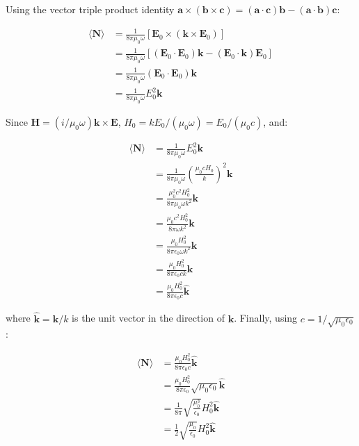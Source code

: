 \documentclass{article}
\begin{document}
Using the vector triple product identity $\mathbf{a} \times (\mathbf{b} \times \mathbf{c}) = (\mathbf{a} \cdot \mathbf{c}) \mathbf{b} - (\mathbf{a} \cdot \mathbf{b}) \mathbf{c}$:

\begin{align*}
\langle \mathbf{N} \rangle &= \frac{1}{8 \pi \mu_0 \omega} [\mathbf{E}_0 \times (\mathbf{k} \times \mathbf{E}_0)] \\
&= \frac{1}{8 \pi \mu_0 \omega} [(\mathbf{E}_0 \cdot \mathbf{E}_0) \mathbf{k} - (\mathbf{E}_0 \cdot \mathbf{k}) \mathbf{E}_0] \\
&= \frac{1}{8 \pi \mu_0 \omega} (\mathbf{E}_0 \cdot \mathbf{E}_0) \mathbf{k} \\
&= \frac{1}{8 \pi \mu_0 \omega} E_0^2 \mathbf{k}
\end{align*}

Since $\mathbf{H} = (i/\mu_0 \omega) \mathbf{k} \times \mathbf{E}$, $H_0 = k E_0 / (\mu_0 \omega) = E_0 / (\mu_0 c)$, and:

\begin{align*}
\langle \mathbf{N} \rangle &= \frac{1}{8 \pi \mu_0 \omega} E_0^2 \mathbf{k} \\
&= \frac{1}{8 \pi \mu_0 \omega} \left( \frac{\mu_0 c H_0}{k} \right)^2 \mathbf{k} \\
&= \frac{\mu_0^2 c^2 H_0^2}{8 \pi \mu_0 \omega k^2} \mathbf{k} \\
&= \frac{\mu_0 c^2 H_0^2}{8 \pi \omega k^2} \mathbf{k} \\
&= \frac{\mu_0 H_0^2}{8 \pi \epsilon_0 \omega k^2} \mathbf{k} \\
&= \frac{\mu_0 H_0^2}{8 \pi \epsilon_0 c k} \mathbf{k} \\
&= \frac{\mu_0 H_0^2}{8 \pi \epsilon_0 c} \hat{\mathbf{k}}
\end{align*}

where $\hat{\mathbf{k}} = \mathbf{k}/k$ is the unit vector in the direction of $\mathbf{k}$.  Finally, using $c = 1/\sqrt{\mu_0 \epsilon_0}$:

\begin{align*}
\langle \mathbf{N} \rangle &= \frac{\mu_0 H_0^2}{8 \pi \epsilon_0 c} \hat{\mathbf{k}} \\
&= \frac{\mu_0 H_0^2}{8 \pi \epsilon_0} \sqrt{\mu_0 \epsilon_0} \hat{\mathbf{k}} \\
&= \frac{1}{8 \pi} \sqrt{\frac{\mu_0^3}{\epsilon_0}} H_0^2 \hat{\mathbf{k}} \\
&= \frac{1}{2} \sqrt{\frac{\mu_0}{\epsilon_0}} H_0^2 \hat{\mathbf{k}}
\end{align*}
\end{document}
